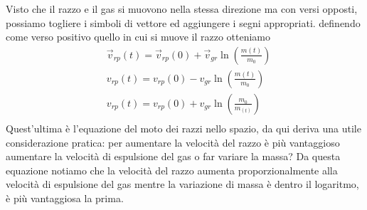 \documentclass[10pt,a4paper]{article}
\begin{document}
Visto che il razzo e il gas si muovono nella stessa direzione ma con versi opposti, possiamo togliere i simboli di vettore ed aggiungere i segni appropriati. definendo come verso positivo quello in cui si muove il razzo otteniamo
\begin{align*}
&\vec{v}_{rp}(t) = \vec{v}_{rp}(0)+ \vec{v}_{gr} \ln(\frac{m(t)}{m_0})\\
&{v}_{rp}(t) = {v}_{rp}(0)- {v}_{gr} \ln(\frac{m(t)}{m_0})\\
&{v}_{rp}(t) = {v}_{rp}(0)+ {v}_{gr} \ln(\frac{m_0}{m_(t)})\\
\end{align*}
Quest'ultima è l'equazione del moto dei razzi nello spazio, da qui deriva una utile considerazione pratica: per aumentare la velocità del razzo è più vantaggioso aumentare la velocità di espulsione del gas o far variare la massa? Da questa equazione notiamo che la velocità del razzo aumenta proporzionalmente alla velocità di espulsione del gas mentre la variazione di massa è dentro il logaritmo, è più vantaggiosa la prima. 
\end{document}
